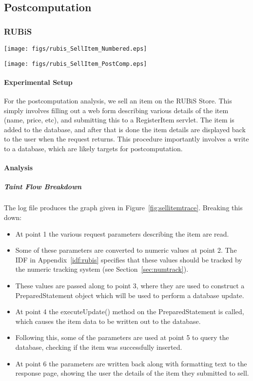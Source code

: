 \documentclass[msc,oneside]{ubcthesis}
\begin{document}
\subsection{Postcomputation}
\subsubsection{RUBiS}

\begin{sidewaysfigure}
\centering
\scalebox{0.44}
{\texttt{[image: figs/rubis\_SellItem\_Numbered.eps]}}
\caption{RUBiS Sell Item Trace} 
\label{fig:sellitemtrace}
\end{sidewaysfigure}

\begin{sidewaysfigure}
\centering
\scalebox{0.44}
{\texttt{[image: figs/rubis\_SellItem\_PostComp.eps]}}
\caption{RUBiS Sell Item Postcomputation Analysis Results} 
\label{fig:sellitempostcomputation}
\end{sidewaysfigure}

\paragraph{Experimental Setup}
For the postcomputation analysis, we sell an item on the RUBiS Store. This simply involves filling out a web form describing various details of the item (name, price, etc), and submitting this to a RegisterItem servlet. The item is added to the database, and after that is done the item details are displayed back to the user when the request returns. This procedure importantly involves a write to a database, which are likely targets for postcomputation.

\paragraph{Analysis}
\subparagraph{Taint Flow Breakdown}
The log file produces the graph given in Figure~\ref{fig:sellitemtrace}. Breaking this down:
\begin{itemize}
\item At point 1 the various request parameters describing the item are read.
\item Some of these parameters are converted to numeric values at point 2. The IDF in Appendix~\ref{idf:rubis} specifies that these values should be tracked by the numeric tracking system (see Section~\ref{sec:numtrack}).
\item These values are passed along to point 3, where they are used to construct a PreparedStatement object which will be used to perform a database update.
\item At point 4 the executeUpdate() method on the PreparedStatement is called, which causes the item data to be written out to the database.
\item Following this, some of the parameters are used at point 5 to query the database, checking if the item was successfully inserted.
\item At point 6 the parameters are written back along with formatting text to the response page, showing the user the details of the item they submitted to sell.
\end{itemize}
\end{document}
